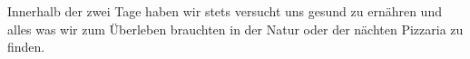 Innerhalb der zwei Tage haben wir stets versucht uns gesund zu ernähren und alles was wir
zum Überleben brauchten in der Natur oder der nächten Pizzaria zu finden.
